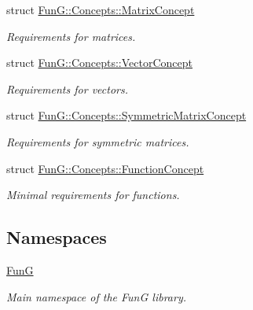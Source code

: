 \begin{DoxyCompactItemize}
struct \hyperlink{structFunG_1_1Concepts_1_1MatrixConcept}{Fun\-G\-::\-Concepts\-::\-Matrix\-Concept}
\begin{DoxyCompactList}\small\item\em Requirements for matrices. \end{DoxyCompactList}\item 
struct \hyperlink{structFunG_1_1Concepts_1_1VectorConcept}{Fun\-G\-::\-Concepts\-::\-Vector\-Concept}
\begin{DoxyCompactList}\small\item\em Requirements for vectors. \end{DoxyCompactList}\item 
struct \hyperlink{structFunG_1_1Concepts_1_1SymmetricMatrixConcept}{Fun\-G\-::\-Concepts\-::\-Symmetric\-Matrix\-Concept}
\begin{DoxyCompactList}\small\item\em Requirements for symmetric matrices. \end{DoxyCompactList}\item 
struct \hyperlink{structFunG_1_1Concepts_1_1FunctionConcept}{Fun\-G\-::\-Concepts\-::\-Function\-Concept}
\begin{DoxyCompactList}\small\item\em Minimal requirements for functions. \end{DoxyCompactList}\end{DoxyCompactItemize}
\subsection*{Namespaces}
\begin{DoxyCompactItemize}
\item 
\hyperlink{namespaceFunG}{Fun\-G}
\begin{DoxyCompactList}\small\item\em Main namespace of the Fun\-G library. \end{DoxyCompactList}\end{DoxyCompactItemize}
